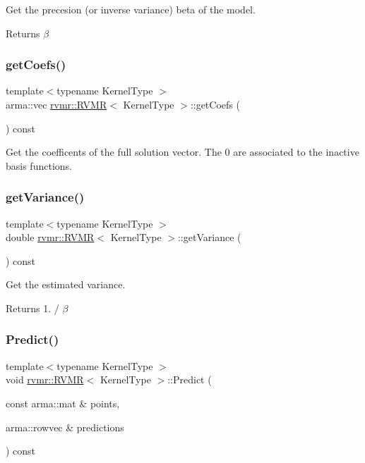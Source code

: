 Get the precesion (or inverse variance) beta of the model. \begin{DoxyReturn}{Returns}
$ \beta $ 
\end{DoxyReturn}
\mbox{\label{classrvmr_1_1RVMR_a3e7161c98ff23a2b95aeb49267abad6d}} 
\subsubsection{\texorpdfstring{get\+Coefs()}{getCoefs()}}
{\footnotesize\ttfamily template$<$typename Kernel\+Type $>$ \\
arma\+::vec \hyperlink{classrvmr_1_1RVMR}{rvmr\+::\+R\+V\+MR}$<$ Kernel\+Type $>$\+::get\+Coefs (\begin{DoxyParamCaption}{ }\end{DoxyParamCaption}) const}

Get the coefficents of the full solution vector. The 0 are associated to the inactive basis functions. \mbox{\label{classrvmr_1_1RVMR_ad33d2446f37b22e00a05575ad5436c89}} 
\subsubsection{\texorpdfstring{get\+Variance()}{getVariance()}}
{\footnotesize\ttfamily template$<$typename Kernel\+Type $>$ \\
double \hyperlink{classrvmr_1_1RVMR}{rvmr\+::\+R\+V\+MR}$<$ Kernel\+Type $>$\+::get\+Variance (\begin{DoxyParamCaption}{ }\end{DoxyParamCaption}) const\hspace{0.3cm}{\ttfamily [inline]}}

Get the estimated variance. \begin{DoxyReturn}{Returns}
1. / $ \beta $ 
\end{DoxyReturn}
\mbox{\label{classrvmr_1_1RVMR_a5ca8b201b2b0687eac17f46f180b02bc}} 
\subsubsection{\texorpdfstring{Predict()}{Predict()}\hspace{0.1cm}{\footnotesize\ttfamily [1/2]}}
{\footnotesize\ttfamily template$<$typename Kernel\+Type $>$ \\
void \hyperlink{classrvmr_1_1RVMR}{rvmr\+::\+R\+V\+MR}$<$ Kernel\+Type $>$\+::Predict (\begin{DoxyParamCaption}\item[{const arma\+::mat \&}]{points,  }\item[{arma\+::rowvec \&}]{predictions }\end{DoxyParamCaption}) const}

